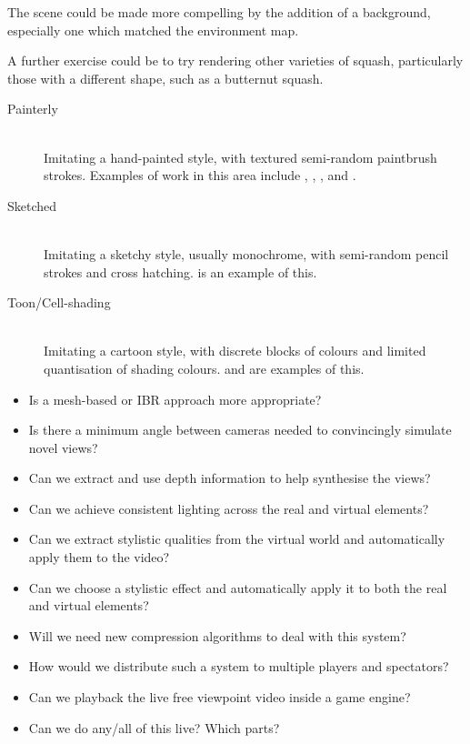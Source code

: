 \documentclass{scrartcl}
\begin{document}
The scene could be made more compelling by the addition of a background, especially one which matched the environment map.

A further exercise could be to try rendering other varieties of squash, particularly those with a different shape, such as a butternut squash.

\begin{description}
\item[Painterly] \hfill \\
Imitating a hand-painted style, with textured semi-random paintbrush strokes. Examples of work in this area include \citet{Litwinowicz1997}, \citet{Hertzmann2000}, \citet{Hays2004}, \citet{Fischer2005} and \citet{Meier1996}.
\item[Sketched] \hfill \\
Imitating a sketchy style, usually monochrome, with semi-random pencil strokes and cross hatching. \citet{Xu2004} is an example of this.
\item[Toon/Cell-shading] \hfill \\
Imitating a cartoon style, with discrete blocks of colours and limited quantisation of shading colours. \cite{Wang2004} and \citet{Collomosse2005} are examples of this.
\end{description}

\begin{itemize}
  \item Is a mesh-based or IBR approach more appropriate?
  \item Is there a minimum angle between cameras needed to convincingly simulate novel views?
  \item Can we extract and use depth information to help synthesise the views?
  \item Can we achieve consistent lighting across the real and virtual elements?
  \item Can we extract stylistic qualities from the virtual world and automatically apply them to the video?
  \item Can we choose a stylistic effect and automatically apply it to both the real and virtual elements?
  \item Will we need new compression algorithms to deal with this system?
  \item How would we distribute such a system to multiple players and spectators?
  \item Can we playback the live free viewpoint video inside a game engine?
  \item Can we do any/all of this live? Which parts?
\end{itemize}


\end{document}
